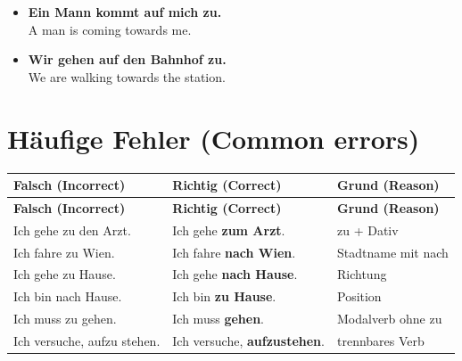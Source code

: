 \documentclass[a4paper,11pt]{article}
\newcommand{\ExampleItem}[2]{\item \textbf{#1}\\{\small\color{SoftGray}#2}}
\newcommand{\TableHead}[1]{\color{white}\textbf{#1}}
\begin{document}
\begin{exbox}
\begin{itemize}
\ExampleItem{Ein Mann kommt auf mich zu.}{A man is coming towards me.}
\ExampleItem{Wir gehen auf den Bahnhof zu.}{We are walking towards the station.}
\end{itemize}
\end{exbox}

\section{Häufige Fehler (Common errors)}
\begin{longtable}{>{\raggedright\arraybackslash}p{4.35cm}>{\raggedright\arraybackslash}p{5.35cm}>{\raggedright\arraybackslash}p{5.1cm}}
\rowcolor{HeaderBlueDark}\TableHead{Falsch (Incorrect)} & \TableHead{Richtig (Correct)} & \TableHead{Grund (Reason)}\\
\endfirsthead
\rowcolor{HeaderBlueDark}\TableHead{Falsch (Incorrect)} & \TableHead{Richtig (Correct)} & \TableHead{Grund (Reason)}\\
\endhead
Ich gehe zu den Arzt. & Ich gehe \textbf{zum Arzt}. & zu + Dativ\\
Ich fahre zu Wien. & Ich fahre \textbf{nach Wien}. & Stadtname mit nach\\
Ich gehe zu Hause. & Ich gehe \textbf{nach Hause}. & Richtung\\
Ich bin nach Hause. & Ich bin \textbf{zu Hause}. & Position\\
Ich muss zu gehen. & Ich muss \textbf{gehen}. & Modalverb ohne zu\\
Ich versuche, aufzu stehen. & Ich versuche, \textbf{aufzustehen}. & trennbares Verb\\
\end{longtable}
\end{document}

